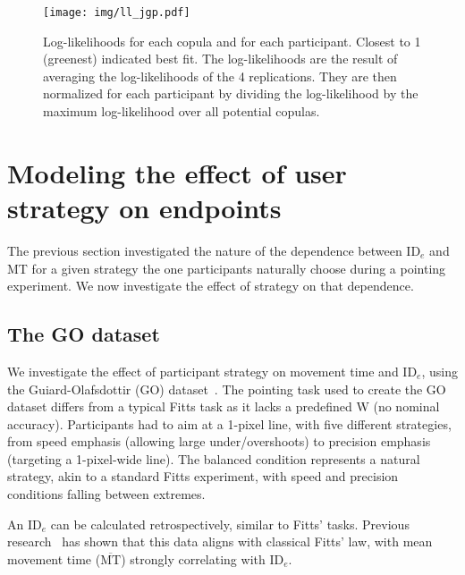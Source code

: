 \documentclass[manuscript,review,anonymous]{acmart}
\newcommand{\mmt}{\ensuremath{\overline{\text{MT}}}\xspace}
\newcommand{\ide}{\ensuremath{{\text{ID}_e}}\xspace}
\begin{document}
\begin{figure}[htbp]
	\centering
	\texttt{[image: img/ll\_jgp.pdf]}
	\caption{Log-likelihoods for each copula and for each participant. Closest to 1 (greenest) indicated best fit. The log-likelihoods are the result of averaging the log-likelihoods of the 4 replications. They are then normalized for each participant by dividing the log-likelihood by the maximum log-likelihood over all potential copulas.}
	\label{fig:copulas_jgp}
\end{figure}










\section{Modeling the effect of user strategy on endpoints \label{sec:gop}}
The previous section investigated the nature of the dependence between \ide and MT for a given strategy \ie the one participants naturally choose during a pointing experiment. We now investigate the effect of strategy on that dependence.


\subsection{The GO dataset}
We investigate the effect of participant strategy on movement time and \ide, using the Guiard-Olafsdottir (GO) dataset~\cite{guiard2011}.
The pointing task used to create the GO dataset differs from a typical Fitts task as it lacks a predefined W (no nominal accuracy). Participants had to aim at a 1-pixel line, with five different strategies, from speed emphasis (allowing large under/overshoots) to precision emphasis (targeting a 1-pixel-wide line). The balanced condition represents a natural strategy, akin to a standard Fitts experiment, with speed and precision conditions falling between extremes.

An \ide can be calculated retrospectively, similar to Fitts' tasks. Previous research~\cite{guiard2011,gori2020} has shown that this data aligns with classical Fitts' law, with mean movement time (\mmt) strongly correlating with \ide.
\end{document}
